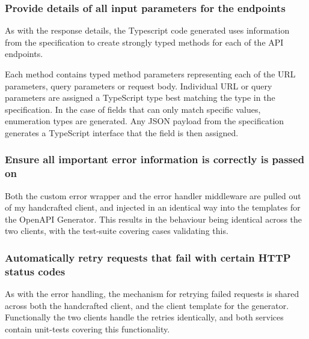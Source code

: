\subsubsection{Provide details of all input parameters for the endpoints}
As with the response details, the Typescript code generated uses information from the specification to create strongly typed methods for each of the API endpoints. 

Each method contains typed method parameters representing each of the URL parameters, query parameters or request body. Individual URL or query parameters are assigned a TypeScript type best matching the type in the specification. In the case of fields that can only match specific values, enumeration types are generated. Any JSON payload from the specification generates a TypeScript interface that the field is then assigned.
\subsubsection{Ensure all important error information is correctly is passed on}
Both the custom error wrapper and the error handler middleware are pulled out of my handcrafted client, and injected in an identical way into the templates for the OpenAPI Generator. This results in the behaviour being identical across the two clients, with the test-suite covering cases validating this.
\subsubsection{Automatically retry requests that fail with certain HTTP status codes}
As with the error handling, the mechanism for retrying failed requests is shared across both the handcrafted client, and the client template for the generator.  Functionally the two clients handle the retries identically, and both services contain unit-tests covering this functionality.